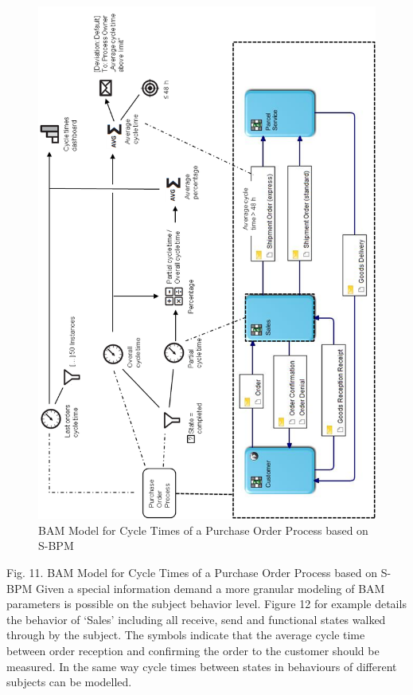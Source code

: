 \begin{figure}[h]
	\centering
	\includegraphics[width=0.9\linewidth]{Figures/Chapter5/BAM-Model-fo- Cycle-Times-of-a-Purchase-Order-Process-based-on-S-BPM.png}
	\caption[BAM Model for Cycle Times of a Purchase Order Process based on S-BPM]{BAM Model for Cycle Times of a Purchase Order Process based on S-BPM}
	\label{fig:Cycle-Time-SBPM}
\end{figure}


Fig. 11. BAM Model for Cycle Times of a Purchase Order Process based on S-BPM
Given a special information demand a more granular modeling of BAM parameters is possible on the subject behavior level. Figure 12 for example details the behavior of ‘Sales’ including all receive, send and functional states walked through by the subject. The symbols indicate that the average cycle time between order reception and confirming the order to the customer should be measured. In the same way cycle times between states in behaviours of different subjects can be modelled.


